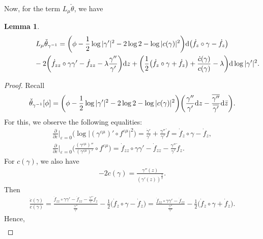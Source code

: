 \documentclass[pdftex]{sigma}%
\numberwithin{equation}{section}
\newtheorem{Lemma}[Theorem]{Lemma}
\newcommand{\ov}{\overline}
\newcommand{\vep}{\varepsilon}
\begin{document}
Now, for the term $L_{\mu}\check{\theta}$, we have

\begin{Lemma}\label{l:l4}
\begin{gather*}%
L_{\mu}\check{\theta}_{\gamma^{-1}}
=\bigg(\phi-\frac{1}{2}\log|\gamma'|^2-2\log2-\log|c(\gamma)|^2\bigg){\rm d}
\big(\dot{f}_z\circ\gamma-\dot{f}_z\big)
\\ \hphantom{L_{\mu}\check{\theta}_{\gamma^{-1}}=}
{}-2\bigg(\dot{f}_{zz}\circ\gamma\gamma'-\dot{f}_{zz}-\lambda\frac{\gamma''}{\gamma'} \bigg){\rm d}z
+\bigg( \frac{1}{2}\big(\dot{f}_z\circ\gamma+\dot{f}_z\big)+\frac{\dot{c}(\gamma)}{c(\gamma)}-\lambda \bigg){\rm d}\log|\gamma'|^2.
\end{gather*}
\end{Lemma}

\begin{proof}
Recall
\begin{gather*} %
\check{\theta}_{\gamma^{-1}}[\phi]
= \bigg(\phi-\frac{1}{2}\log|\gamma'|^2-2\log2-\log|c(\gamma)|^2 \bigg)
 \bigg(\frac{\gamma''}{\gamma'} {\rm d}z -\frac{\ov{\gamma''}}{\ov{\gamma'}}{\rm d}\bar{z}\bigg).
\end{gather*}
For this, we observe the following equalities:
\begin{gather*}
\frac{\partial}{\partial\vep}\bigg|_{\vep=0}\big(\log\big|(\gamma^{\vep\mu})'\circ f^{\vep\mu}\big|^2 \big)= \frac{\dot{\gamma}'}{\gamma'}+\frac{\gamma''}{\gamma'}\dot{f} = \dot{f}_z\circ \gamma -\dot{f}_z,
\\[.5ex]
\frac{\partial}{\partial\vep}\bigg|_{\vep=0}
\bigg(\frac{(\gamma^{\vep\mu})''}{(\gamma^{\vep\mu})'}\circ f^{\vep\mu} \bigg)
=\dot{f}_{zz}\circ \gamma \gamma' -\dot{f}_{zz} -\frac{\gamma''}{\gamma'}\dot{f}_z.
\end{gather*}
For $c(\gamma)$, we also have
\begin{gather*}%
-2c(\gamma)=\frac{\gamma''(z)}{(\gamma'(z))^{\frac{3}{2}}}.
\end{gather*}
Then
\begin{gather}
\frac{\dot{c}(\gamma)}{c(\gamma)}=\frac{\dot{f}_{zz}\circ\gamma\gamma'-\dot{f}_{zz}
-\frac{\gamma''}{\gamma'}\dot{f}_z}{\frac{\gamma''}{\gamma'}}-\frac{1}{2}
\big(\dot{f}_z\circ\gamma-\dot{f}_z\big)
=\frac{\dot{f}_{zz}\circ\gamma\gamma'-\dot{f}_{zz}}{\frac{\gamma''}{\gamma'}}-\frac{1}{2}
\big(\dot{f}_z\circ\gamma+\dot{f}_z\big).\label{e:cc}
\end{gather}
Hence,
\begin{gather*}

\end{gather*}
\end{proof}
\end{document}

